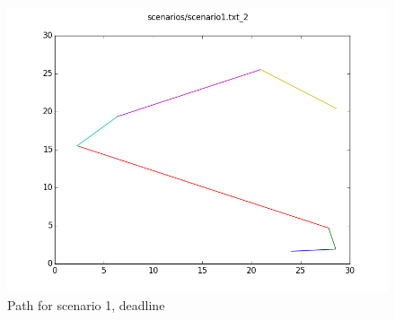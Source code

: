 \documentclass[paper=a4, fontsize=11pt]{scrartcl} %
\numberwithin{equation}{section} %
\numberwithin{figure}{section} %
\numberwithin{table}{section} %
\begin{document}
\begin{figure}[H]
	\centering
  \includegraphics[width=1\textwidth]{results/1_2.png}
	\caption{Path for scenario 1, deadline}
\end{figure}
\end{document}
